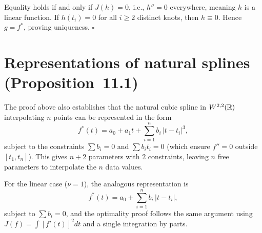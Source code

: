 Equality holds if and only if $J(h)=0$, i.e., $h''=0$ everywhere,
meaning $h$ is a linear function.  If $h(t_i)=0$ for all $i\geq 2$
distinct knots, then $h\equiv 0$.  Hence $g = f^*$, proving
uniqueness. \hfill$\square$

\section*{Representations of natural splines (Proposition~11.1)}

The proof above also establishes that the natural cubic spline in
$W^{2,2}(\mathbb{R})$ interpolating $n$ points can be represented in the form
\[
  f^*(t) = a_0 + a_1 t + \sum_{i=1}^n b_i\,|t-t_i|^3,
\]
subject to the constraints $\sum b_i = 0$ and $\sum b_i t_i = 0$
(which ensure $f''=0$ outside $[t_1,t_n]$).  This gives
$n+2$ parameters with $2$ constraints, leaving $n$ free parameters
to interpolate the $n$ data values.

For the linear case ($\nu=1$), the analogous representation is
\[
  f^*(t) = a_0 + \sum_{i=1}^n b_i\,|t-t_i|,
\]
subject to $\sum b_i = 0$, and the optimality proof follows the same
argument using $J(f) = \int [f'(t)]^2 dt$ and a single integration
by parts.


